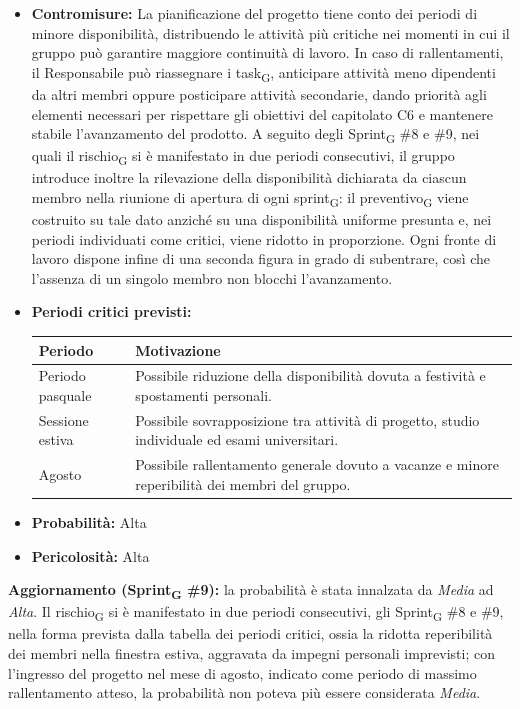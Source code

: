 ﻿\documentclass[a4paper, 10pt, colorlinks=true, linkcolor=black, urlcolor=blue, citecolor=blue, hidelinks]{article}
\renewcommand{\arraystretch}{1.2}
\begin{document}
\begin{itemize}
    \item \textbf{Contromisure:} La pianificazione del progetto tiene conto dei periodi di minore disponibilità, distribuendo le attività più critiche nei momenti in cui il gruppo può garantire maggiore continuità di lavoro. In caso di rallentamenti, il Responsabile può riassegnare i task\textsubscript{G}, anticipare attività meno dipendenti da altri membri oppure posticipare attività secondarie, dando priorità agli elementi necessari per rispettare gli obiettivi del capitolato C6 e mantenere stabile l'avanzamento del prodotto. A seguito degli Sprint\textsubscript{G} \#8 e \#9, nei quali il rischio\textsubscript{G} si è manifestato in due periodi consecutivi, il gruppo introduce inoltre la rilevazione della disponibilità dichiarata da ciascun membro nella riunione di apertura di ogni sprint\textsubscript{G}: il preventivo\textsubscript{G} viene costruito su tale dato anziché su una disponibilità uniforme presunta e, nei periodi individuati come critici, viene ridotto in proporzione. Ogni fronte di lavoro dispone infine di una seconda figura in grado di subentrare, così che l'assenza di un singolo membro non blocchi l'avanzamento.
    \item \textbf{Periodi critici previsti:}
    \begin{center}
        \renewcommand{\arraystretch}{1.3}
        \begin{tabularx}{0.9\textwidth}{|l|X|}
            \hline
            \textbf{Periodo} & \textbf{Motivazione} \\
            \hline
            Periodo pasquale & Possibile riduzione della disponibilità dovuta a festività e spostamenti personali. \\
            \hline
            Sessione estiva & Possibile sovrapposizione tra attività di progetto, studio individuale ed esami universitari. \\
            \hline
            Agosto & Possibile rallentamento generale dovuto a vacanze e minore reperibilità dei membri del gruppo. \\
            \hline
        \end{tabularx}
    \end{center}

    \item \textbf{Probabilità:} Alta

    \item \textbf{Pericolosità:} Alta
\end{itemize}

\textbf{Aggiornamento (Sprint\textsubscript{G} \#9):} la probabilità è stata innalzata da \textit{Media} ad \textit{Alta}. Il rischio\textsubscript{G} si è manifestato in due periodi consecutivi, gli Sprint\textsubscript{G} \#8 e \#9, nella forma prevista dalla tabella dei periodi critici, ossia la ridotta reperibilità dei membri nella finestra estiva, aggravata da impegni personali imprevisti; con l'ingresso del progetto nel mese di agosto, indicato come periodo di massimo rallentamento atteso, la probabilità non poteva più essere considerata \textit{Media}.
\end{document}
